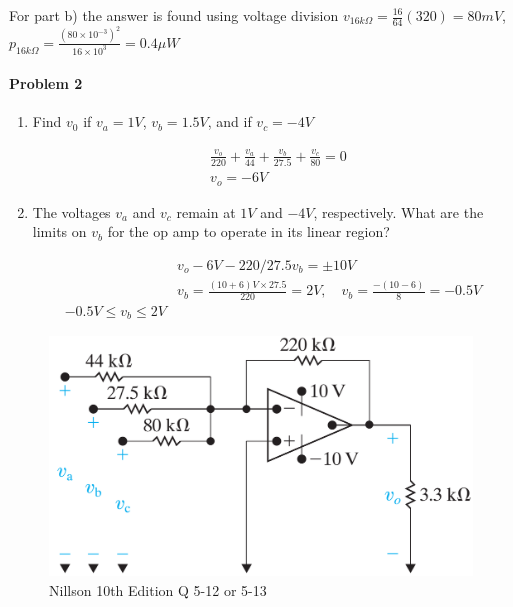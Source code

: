 For part b) the answer is found using voltage division $v_{16 k \Omega} =\frac{16}{64}(320)=80 m V$, $p_{16 k \Omega}=\frac{(80 \times 10^{-3})^2}{16 \times 10^3}= 0.4 \mu W$

\paragraph{Problem 2}

\begin{enumerate}[label=(\alph*)]
	\item Find $v_0$ if $v_a = 1V$, $v_b =1.5V$, and if $v_c = -4V$
	
	\begin{align*}
	& \frac{v_o}{220} + \frac{v_a}{44}+\frac{v_b}{27.5} + \frac{v_c}{80}=0\\
	& v_o = -6 V
	\end{align*}
	\item The voltages $v_a$ and $v_c$ remain at $1V$ and $-4V$, respectively. What are the limits on $v_b$ for the
	op amp to operate in its linear region?
	
	\begin{align*}
	& v_o -6 V - 220/27.5 v_b = \pm 10 V \\
	& v_b = \frac{(10+6)V \times 27.5}{220}= 2V, \quad v_b = \frac{-(10-6)}{8}=-0.5 V \\
	-0.5V \leq v_b \leq 2V
	\end{align*}
\end{enumerate}
\begin{figure}[H]
	\centering
	\includegraphics[width=1\linewidth]{images/P2Nillson10thQ5_12_513.png}
	\caption{Nillson 10th Edition Q 5-12 or 5-13}
	\label{fig:p2nillson10thq512513}
\end{figure}
